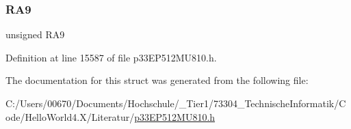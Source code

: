 \subsubsection{\texorpdfstring{R\+A9}{RA9}}
{\footnotesize\ttfamily unsigned R\+A9}



Definition at line 15587 of file p33\+E\+P512\+M\+U810.\+h.



The documentation for this struct was generated from the following file\+:\begin{DoxyCompactItemize}
\item 
C\+:/\+Users/00670/\+Documents/\+Hochschule/\+\_\+\+Tier1/73304\+\_\+\+Technische\+Informatik/\+Code/\+Hello\+World4.\+X/\+Literatur/\hyperlink{p33_e_p512_m_u810_8h}{p33\+E\+P512\+M\+U810.\+h}\end{DoxyCompactItemize}
